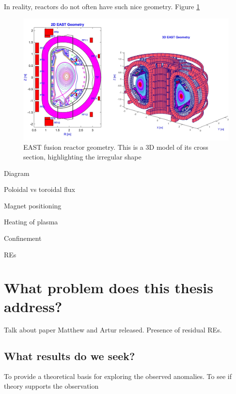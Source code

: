 In reality, reactors do not often have such nice geometry. Figure \ref{fig:east-geometry}
\begin{figure}[h!]
    \centering
    \includegraphics[scale=0.2]{imgs/c1/east-cross-section.png}
    \caption{EAST fusion reactor geometry. This is a 3D model of its cross section, highlighting the irregular shape \cite{east-geometry-article}}
    \label{fig:east-geometry}
\end{figure}

Diagram

Poloidal vs toroidal flux

Magnet positioning

Heating of plasma

Confinement

REs

\section{What problem does this thesis address?}

Talk about paper Matthew and Artur released. Presence of residual REs.

\TODO 


\subsection{What results do we seek?}

To provide a theoretical basis for exploring the observed anomalies. 
To see if theory supports the observation

